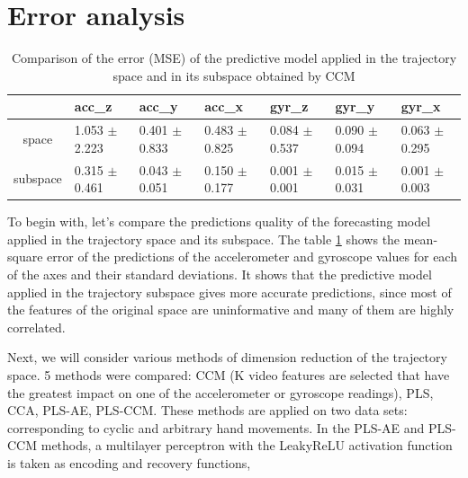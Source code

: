 \documentclass[bst/sn-mathphys]{sn-jnl}%
\theoremstyle{thmstyleone}%
\theoremstyle{thmstyletwo}%
\theoremstyle{thmstylethree}%
\begin{document}
\section{Error analysis}
\begin{table}[bhtp]
	\fontsize{10pt}{14pt}
	\selectfont
	\centering
	\caption{Comparison of the error (MSE) of the predictive model applied in the trajectory space and in its subspace obtained by CCM}
	\label{tbl:space_and_subspace}
	\begin{tabularx}{\textwidth}{c|XXXXXX}
		\hline
		& acc\_z & acc\_y & acc\_x & gyr\_z & gyr\_y & gyr\_x \\
		\hline
		space & 1.053 $\pm$ 2.223 & 0.401 $\pm$ 0.833 & 0.483 $\pm$ 0.825 & 0.084 $\pm$ 0.537 & 0.090 $\pm$ 0.094 & 0.063 $\pm$ 0.295 \\
		\hline
		subspace & 0.315 $\pm$ 0.461 & 0.043 $\pm$ 0.051 & 0.150 $\pm$ 0.177 & 0.001 $\pm$ 0.001	& 0.015 $\pm$ 0.031 & 0.001 $\pm$ 0.003 \\
		\hline
	\end{tabularx}
\end{table}

To begin with, let's compare the predictions quality of the forecasting model applied in the trajectory space and its subspace.
The table \ref{tbl:space_and_subspace} shows the mean-square error of the predictions of the accelerometer and gyroscope values for each of the axes and their standard deviations.
It shows that the predictive model applied in the trajectory subspace gives more accurate predictions, since most of the features of the original space are uninformative and many of them are highly correlated.

Next, we will consider various methods of dimension reduction of the trajectory space.
5 methods were compared: CCM (K video features are selected that have the greatest impact on one of the accelerometer or gyroscope readings), PLS, CCA, PLS-AE, PLS-CCM.
These methods are applied on two data sets: corresponding to cyclic and arbitrary hand movements.
In the PLS-AE and PLS-CCM methods, a multilayer perceptron with the LeakyReLU activation function is taken as encoding and recovery functions, 
\end{document}
